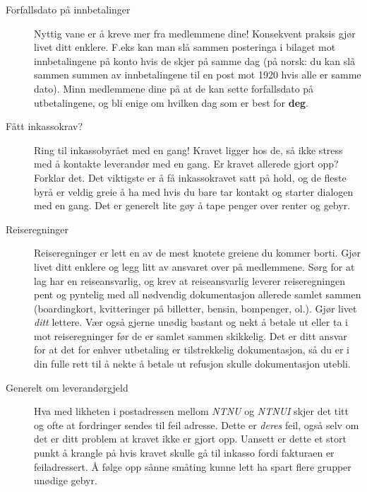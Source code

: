 \begin{description}
\item [Forfallsdato på innbetalinger] Nyttig vane er å kreve mer fra medlemmene dine! Konsekvent praksis gjør livet ditt enklere. F.eks kan man slå sammen posteringa i bilaget mot innbetalingene på konto hvis de skjer på samme dag (på norsk: du kan slå sammen summen av innbetalingene til en post mot 1920 hvis alle er samme dato). Minn medlemmene dine på at de kan sette forfallsdato på utbetalingene, og bli enige om hvilken dag som er best for {\bfseries deg}.
\item[Fått inkassokrav?] Ring til inkassobyrået med en gang! Kravet ligger hos de, så ikke stress med å kontakte leverandør med en gang. Er kravet allerede gjort opp? Forklar det. Det viktigste er å få inkassokravet satt på hold, og de fleste byrå er veldig greie å ha med hvis du bare tar kontakt og starter dialogen med en gang. Det er generelt lite gøy å tape penger over renter og gebyr.
\item[Reiseregninger] Reiseregninger er lett en av de mest knotete greiene du kommer borti. Gjør livet ditt enklere og legg litt av ansvaret over på medlemmene. Sørg for at lag har en reiseansvarlig, og krev at reiseansvarlig leverer reiseregningen pent og pyntelig med all nødvendig dokumentasjon allerede samlet sammen (boardingkort, kvitteringer på billetter, bensin, bompenger, ol.). Gjør livet \emph{ditt} lettere. Vær også gjerne unødig bastant og nekt å betale ut eller ta i mot reiseregninger før de er samlet sammen skikkelig. Det er ditt ansvar for at det for enhver utbetaling er tilstrekkelig dokumentasjon, så du er i din fulle rett til å nekte å betale ut refusjon skulle dokumentasjon utebli.
\item[Generelt om leverandørgjeld] Hva med likheten i postadressen mellom \emph{NTNU} og \emph{NTNUI} skjer det titt og ofte at fordringer sendes til feil adresse. Dette er \emph{deres} feil, også selv om det er ditt problem at kravet ikke er gjort opp. Uansett er dette et stort punkt å krangle på hvis kravet skulle gå til inkasso fordi fakturaen er feiladressert. Å følge opp sånne småting kunne lett ha spart flere grupper unødige gebyr.
\end{description}
